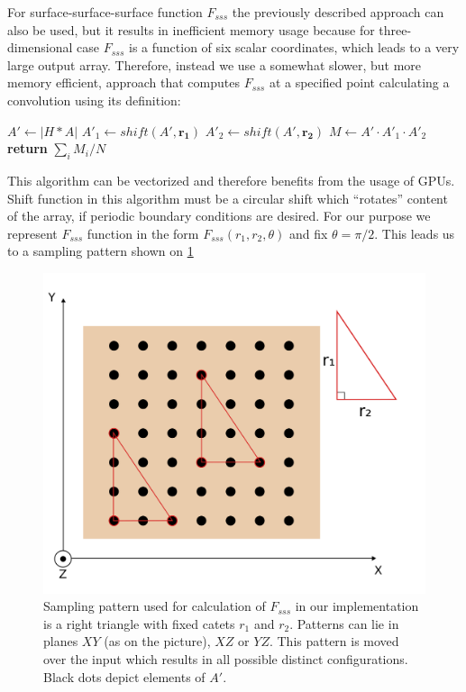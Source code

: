 \documentclass[1p]{elsarticle}
\begin{document}
For surface-surface-surface function $F_{sss}$ the previously described approach
can also be used, but it results in inefficient memory usage because for
three-dimensional case $F_{sss}$ is a function of six scalar coordinates, which
leads to a very large output array. Therefore, instead we use a somewhat slower,
but more memory efficient, approach that computes $F_{sss}$ at a specified point
calculating a convolution using its definition:
\begin{algorithmic}[1]
  \State $A' \gets |H*A|$
  \State $A'_1 \gets shift(A', \bm{r_1})$
  \State $A'_2 \gets shift(A', \bm{r_2})$
  \State $M \gets A' \cdot A'_1 \cdot A'_2$
  \State \textbf{return} $\sum_{i} M_{i} / N$
  \EndProcedure
\end{algorithmic}
This algorithm can be vectorized and therefore benefits from the usage of
GPUs. Shift function in this algorithm must be a circular shift which
``rotates'' content of the array, if periodic boundary conditions are
desired. For our purpose we represent $F_{sss}$ function in the form
$F_{sss}(r_1, r_2, \theta)$ and fix $\theta = \pi/2$. This leads us to a
sampling pattern shown on \cref{fig:Fsss-pattern}
\begin{figure}
  \centering
  \includegraphics[width=0.8\linewidth]{images/pattern.png}
  \caption[]{Sampling pattern used for calculation of $F_{sss}$ in our
    implementation is a right triangle with fixed catets $r_1$ and $r_2$.
    Patterns can lie in planes $XY$ (as on the picture), $XZ$ or $YZ$. This
    pattern is moved over the input which results in all possible distinct
    configurations. Black dots depict elements of $A'$.}
  \label{fig:Fsss-pattern}
\end{figure}
\end{document}

